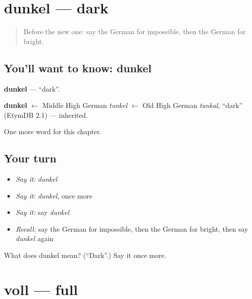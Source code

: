 \section[dunkel]{dunkel — dark}

\label{lesson:GE-C168-dunkel}



\begin{quote}
Before the new one: say the German for impossible, then the German for bright.
\end{quote}

\subsection*{You'll want to know: dunkel}
\textbf{dunkel} — \textquotedblleft{}dark\textquotedblright{}.

\begin{cousinweb}
\textbf{dunkel} $\leftarrow$ Middle High German \emph{tunkel} $\leftarrow$ Old High German \emph{tunkal}, \textquotedblleft{}dark\textquotedblright{} (EtymDB 2.1) — inherited.
\end{cousinweb}

\begin{grammarlens}[title={What you've built}]
One more word for this chapter.
\end{grammarlens}

\subsection*{Your turn}
\begin{itemize}
\raggedright
  \item \emph{Say it:} \emph{dunkel}
  \item \emph{Say it:} \emph{dunkel}, once more
  \item \emph{Say it:} say \emph{dunkel}
  \item \emph{Recall:} say the German for impossible, then the German for bright, then say \emph{dunkel} again
\end{itemize}

\begin{tcolorbox}[breakable,colback=teal!4,colframe=teal!35!black,title={Before you move on}]
What does dunkel mean? (\textquotedblleft{}Dark\textquotedblright{}.) Say it once more.
\end{tcolorbox}
\section[voll]{voll — full}

